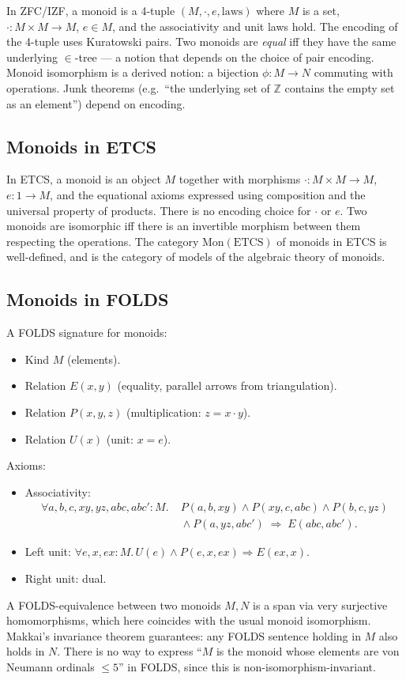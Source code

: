 \documentclass[12pt]{article}
\theoremstyle{definition}
\theoremstyle{remark}
\begin{document}
In ZFC/IZF, a monoid is a 4-tuple $(M, \cdot, e, \text{laws})$ where $M$ is a set, $\cdot:
M\times M\to M$, $e\in M$, and the associativity and unit laws hold. The encoding of the
4-tuple uses Kuratowski pairs. Two monoids are \emph{equal} iff they have the same
underlying $\in$-tree --- a notion that depends on the choice of pair encoding. Monoid
isomorphism is a derived notion: a bijection $\phi: M\to N$ commuting with operations.
Junk theorems (e.g.\ ``the underlying set of $\mathbb{Z}$ contains the empty set as an
element'') depend on encoding.

\subsection{Monoids in ETCS}

In ETCS, a monoid is an object $M$ together with morphisms $\cdot: M\times M\to M$,
$e: 1\to M$, and the equational axioms expressed using composition and the universal
property of products. There is no encoding choice for $\cdot$ or $e$. Two monoids are
isomorphic iff there is an invertible morphism between them respecting the operations.
The category $\mathrm{Mon}(\mathrm{ETCS})$ of monoids in ETCS is well-defined, and is the
category of models of the algebraic theory of monoids.

\subsection{Monoids in FOLDS}

A FOLDS signature for monoids:
\begin{itemize}
\item Kind $M$ (elements).
\item Relation $E(x,y)$ (equality, parallel arrows from triangulation).
\item Relation $P(x,y,z)$ (multiplication: $z = x\cdot y$).
\item Relation $U(x)$ (unit: $x = e$).
\end{itemize}
Axioms:
\begin{itemize}
\item Associativity:
\[
\begin{aligned}
\forall a,b,c,xy,yz,abc,abc': M.\;
& P(a,b,xy) \wedge P(xy,c,abc) \wedge P(b,c,yz) \\
& {} \wedge P(a,yz,abc') \;\Rightarrow\; E(abc, abc').
\end{aligned}
\]
\item Left unit: $\forall e, x, ex: M.\, U(e) \wedge P(e,x,ex) \Rightarrow E(ex, x)$.
\item Right unit: dual.
\end{itemize}
A FOLDS-equivalence between two monoids $M, N$ is a span via very surjective
homomorphisms, which here coincides with the usual monoid isomorphism. Makkai's
invariance theorem guarantees: any FOLDS sentence holding in $M$ also holds in $N$.
There is no way to express ``$M$ is the monoid whose elements are von Neumann ordinals
$\le 5$'' in FOLDS, since this is non-isomorphism-invariant.
\end{document}

